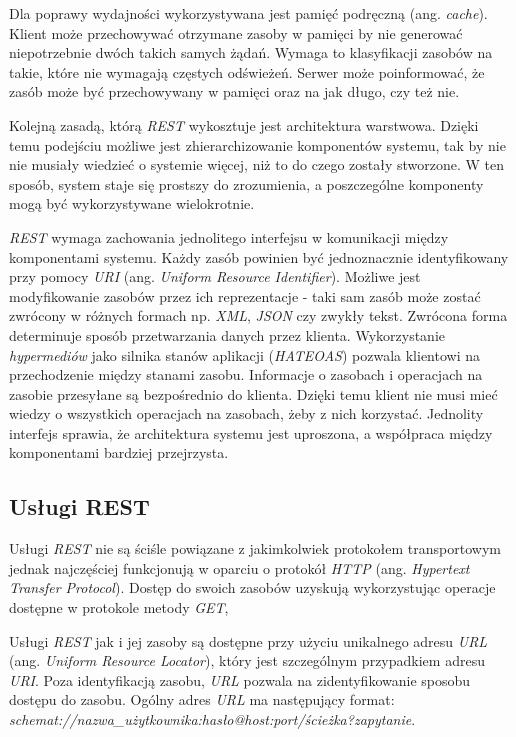 Dla poprawy wydajności wykorzystywana jest pamięć podręczną (ang. \textsl{cache}). Klient może przechowywać otrzymane zasoby w pamięci by nie generować niepotrzebnie dwóch takich samych żądań. Wymaga to klasyfikacji zasobów na takie, które nie wymagają częstych odświeżeń. Serwer może poinformować, że zasób może być przechowywany w pamięci oraz na jak długo, czy też nie.  

Kolejną zasadą, którą \textsl{REST} wykosztuje jest architektura warstwowa. Dzięki temu podejściu możliwe jest zhierarchizowanie komponentów systemu, tak by nie nie musiały wiedzieć o systemie więcej, niż to do czego zostały stworzone. W ten sposób, system staje się prostszy do zrozumienia, a poszczególne komponenty mogą być wykorzystywane wielokrotnie.

 \textsl{REST} wymaga zachowania jednolitego interfejsu w komunikacji między komponentami systemu. Każdy zasób powinien być jednoznacznie identyfikowany przy pomocy \textsl{URI} (ang. \textsl{Uniform Resource Identifier}). Możliwe jest modyfikowanie zasobów przez ich reprezentacje - taki sam zasób może zostać zwrócony w różnych formach np. \textsl{XML}, \textsl{JSON} czy zwykły tekst. Zwrócona forma determinuje sposób przetwarzania danych przez klienta. Wykorzystanie  \textsl{hypermediów} jako silnika stanów aplikacji (\textsl{HATEOAS}) pozwala klientowi na przechodzenie między stanami zasobu. Informacje o  zasobach i operacjach na zasobie przesyłane są bezpośrednio do klienta. Dzięki temu klient nie musi mieć wiedzy o wszystkich operacjach na zasobach, żeby z nich korzystać. Jednolity interfejs sprawia, że architektura systemu jest uproszona, a współpraca między komponentami bardziej przejrzysta.
 
 
\subsection{Usługi REST}
Usługi \textsl{REST} nie są ściśle powiązane z jakimkolwiek protokołem transportowym jednak najczęściej funkcjonują w oparciu o protokół \textsl{HTTP} (ang. \textsl{Hypertext Transfer Protocol}). Dostęp do swoich zasobów uzyskują wykorzystując operacje dostępne w protokole metody \textsl{GET}, 

Usługi \textsl{REST} jak i jej zasoby są dostępne przy użyciu unikalnego adresu \textsl{URL} (ang. \textsl{Uniform Resource Locator}), który jest szczególnym przypadkiem adresu \textsl{URI}. Poza identyfikacją zasobu, \textsl{URL} pozwala na zidentyfikowanie sposobu dostępu do zasobu. Ogólny adres \textsl{URL} ma następujący format: \\ \textsl{schemat://nazwa\_użytkownika:hasło@host:port/ścieżka?zapytanie}. 

